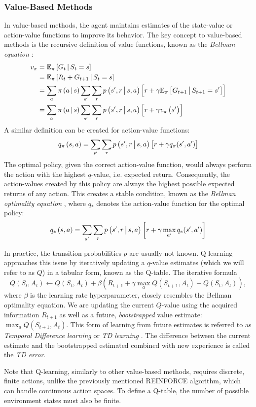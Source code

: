 \subsubsection{Value-Based Methods}
In value-based methods, the agent maintains estimates of the state-value or action-value functions to improve its behavior. The key concept to value-based methods is the recursive definition of value functions, known as the \textit{Bellman equation} \cite{bible}:
\begin{align*}
    v_\pi &= \mathbb{E}_\pi \left[G_t \,\middle|\, S_t = s\right] \\
          &= \mathbb{E}_\pi \left[R_t + G_{t+1} \,\middle|\, S_t = s\right] \\
          &= \sum_a \pi\left(a \,\middle|\, s\right) \sum_{s'} \sum_r p\left(s', r \,\middle|\, s, a\right) \left[r + \gamma \mathbb{E}_\pi\left[G_{t+1} \,\middle|\, S_{t+1} = s'\right]\right] \\
          &= \sum_a \pi\left(a \,\middle|\, s\right) \sum_{s'} \sum_r p\left(s', r \,\middle|\, s, a\right) \left[r + \gamma v_\pi\left(s'\right)\right]
\end{align*}
A similar definition can be created for action-value functions:
\begin{equation*}
    q_\pi\left(s, a\right) = \sum_{s'} \sum_r p\left(s', r \,\middle|\, s, a\right) \left[r + \gamma q_\pi(s', a')\right]
\end{equation*}
The optimal policy, given the correct action-value function, would always perform the action with the highest $q$-value, i.e. expected return. Consequently, the action-values created by this policy are always the highest possible expected returns of any action. This creates a stable condition, known as the \textit{Bellman optimality equation} \cite{bible}, where $q_*$ denotes the action-value function for the optimal policy:
\begin{equation*}
    q_*\left(s, a\right) = \sum_{s'} \sum_r p\left(s', r \,\middle|\, s, a\right) \left[r + \gamma \max_{a'} q_*(s', a')\right]
\end{equation*}

In practice, the transition probabilities $p$ are usually not known. Q-learning \cite{q-learning} approaches this issue by iteratively updating a $q$-value estimates (which we will refer to as $Q$) in a tabular form, known as the Q-table. The iterative formula
\begin{equation*}
    Q\left(S_t, A_t\right) \gets Q\left(S_t, A_t\right) + \beta\left(R_{t+1} + \gamma \max_a Q\left(S_{t+1}, A_t\right) - Q\left(S_t, A_t\right)\right),
\end{equation*}
where $\beta$ is the learning rate hyperparameter, closely resembles the Bellman optimality equation. We are updating the current $Q$-value using the acquired information $R_{t+1}$ as well as a future, \textit{bootstrapped} value estimate: $\max_a Q\left(S_{t+1}, A_t\right)$. This form of learning from future estimates is referred to as \textit{Temporal Difference learning} or \textit{TD learning} \cite{td-learning}. The difference between the current estimate and the bootstrapped estimated combined with new experience is called the \textit{TD error}.

Note that Q-learning, similarly to other value-based methods, requires discrete, finite actions, unlike the previously mentioned REINFORCE algorithm, which can handle continuous action spaces. To define a Q-table, the number of possible environment states must also be finite.